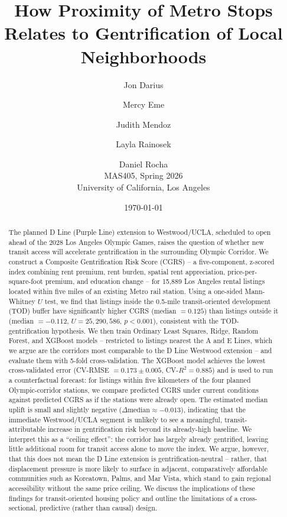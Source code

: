 \documentclass[11pt]{article}
\title{\textbf{How Proximity of Metro Stops Relates to Gentrification of Local Neighborhoods}}
\author{
  Jon Darius \and Mercy Eme \and Judith Mendoz \and Layla Rainosek \and Daniel Rocha \\
  \small MAS405, Spring 2026 \\
  \small University of California, Los Angeles
}
\date{\today}
\begin{document}
\maketitle

\begin{abstract}
\noindent
The planned D Line (Purple Line) extension to Westwood/UCLA, scheduled to open ahead of the 2028 Los Angeles Olympic Games, raises the question of whether new transit access will accelerate gentrification in the surrounding Olympic Corridor. We construct a Composite Gentrification Risk Score (CGRS) -- a five-component, z-scored index combining rent premium, rent burden, spatial rent appreciation, price-per-square-foot premium, and education change -- for 15,889 Los Angeles rental listings located within five miles of an existing Metro rail station. Using a one-sided Mann-Whitney $U$ test, we find that listings inside the 0.5-mile transit-oriented development (TOD) buffer have significantly higher CGRS (median $=0.125$) than listings outside it (median $=-0.112$, $U = 25{,}290{,}586$, $p<0.001$), consistent with the TOD-gentrification hypothesis. We then train Ordinary Least Squares, Ridge, Random Forest, and XGBoost models -- restricted to listings nearest the A and E Lines, which we argue are the corridors most comparable to the D Line Westwood extension -- and evaluate them with 5-fold cross-validation. The XGBoost model achieves the lowest cross-validated error (CV-RMSE $= 0.173 \pm 0.005$, CV-$R^2 = 0.885$) and is used to run a counterfactual forecast: for listings within five kilometers of the four planned Olympic-corridor stations, we compare predicted CGRS under current conditions against predicted CGRS as if the stations were already open. The estimated median uplift is small and slightly negative ($\Delta \text{median} \approx -0.013$), indicating that the immediate Westwood/UCLA segment is unlikely to see a meaningful, transit-attributable increase in gentrification risk beyond its already-high baseline. We interpret this as a ``ceiling effect'': the corridor has largely already gentrified, leaving little additional room for transit access alone to move the index. We argue, however, that this does not mean the D Line extension is gentrification-neutral -- rather, that displacement pressure is more likely to surface in adjacent, comparatively affordable communities such as Koreatown, Palms, and Mar Vista, which stand to gain regional accessibility without the same price ceiling. We discuss the implications of these findings for transit-oriented housing policy and outline the limitations of a cross-sectional, predictive (rather than causal) design.
\end{abstract}
\end{document}
